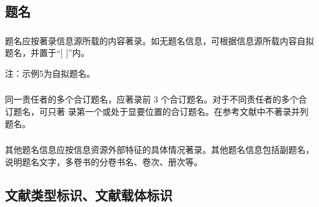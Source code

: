 \documentclass[twoside]{article}%
\begin{document}
\subsection{题名}

\subsubsection{}\label{sec:title:first} 题名应按著录信息源所载的内容著录。如无题名信息，可根据信息源所载内容自拟题名，并置于“[ ]”内。
\begin{refsection}
\nocite{西游记词汇--}
\nocite{张子正蒙注--}
\nocite{法哲学原理--}
\nocite{北京师范大学学报--}
\nocite{昨日之歌--}
\nocite{Gasesinsea--}
\nocite{jmath--}

{}

\mbox{}{\small 注：示例5为自拟题名。 \par}
\end{refsection}

\subsubsection{}\label{sec:author:many} 同一责任者的多个合订题名，应著录前 3 个合订题名。对于不同责任者的多个合订题名，可只著
录第一个或处于显要位置的合订题名。在参考文献中不著录并列题名。

\begin{refsection}
\nocite{为人民服务--}
\nocite{大趋势--}

{}
\end{refsection}

\subsubsection{}\label{sec:title:other} 其他题名信息应按信息资源外部特征的具体情况著录。其他题名信息包括副题名，说明题名文字，多卷书的分卷书名、卷次、册次等。

\begin{refsection}
\nocite{地壳运动--}
\nocite{三松堂--}
\nocite{世界出版业--}
\nocite{ECL集成电路--}
\nocite{中国科学技术史--}
\nocite{红楼梦--}
\nocite{AsianPacificjournal--}

{}
\end{refsection}


\subsection{文献类型标识、文献载体标识}
\end{document}
